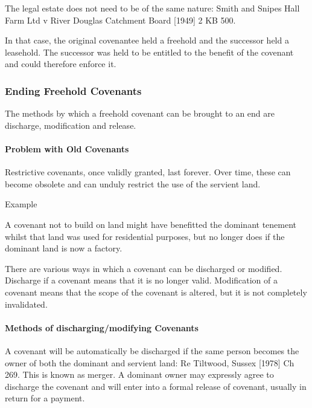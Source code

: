 \documentclass[
]{article}
\newenvironment{env-de3101d4-f08b-48eb-bc0e-2fa06f3bcf8e}
{
    \savenotes\tcolorbox[blanker,breakable,left=5pt,borderline west={2pt}{-4pt}{purple}]
}
{
    \endtcolorbox\spewnotes
}
\begin{document}
The legal estate does not need to be of the same nature: Smith and
Snipes Hall Farm Ltd v River Douglas Catchment Board {[}1949{]} 2 KB
500.

In that case, the original covenantee held a freehold and the successor
held a leasehold. The successor was held to be entitled to the benefit
of the covenant and could therefore enforce it.

\hypertarget{ending-freehold-covenants}{%
\subsubsection{Ending Freehold
Covenants}\label{ending-freehold-covenants}}

The methods by which a freehold covenant can be brought to an end are
discharge, modification and release.

\hypertarget{problem-with-old-covenants}{%
\paragraph{Problem with Old
Covenants}\label{problem-with-old-covenants}}

Restrictive covenants, once validly granted, last forever. Over time,
these can become obsolete and can unduly restrict the use of the
servient land.

\begin{env-de3101d4-f08b-48eb-bc0e-2fa06f3bcf8e}

Example

A covenant not to build on land might have benefitted the dominant
tenement whilst that land was used for residential purposes, but no
longer does if the dominant land is now a factory.

\end{env-de3101d4-f08b-48eb-bc0e-2fa06f3bcf8e}

There are various ways in which a covenant can be discharged or
modified. Discharge if a covenant means that it is no longer valid.
Modification of a covenant means that the scope of the covenant is
altered, but it is not completely invalidated.

\hypertarget{methods-of-dischargingmodifying-covenants}{%
\paragraph{Methods of discharging/modifying
Covenants}\label{methods-of-dischargingmodifying-covenants}}

A covenant will be automatically be discharged if the same person
becomes the owner of both the dominant and servient land: Re Tiltwood,
Sussex {[}1978{]} Ch 269. This is known as merger. A dominant owner may
expressly agree to discharge the covenant and will enter into a formal
release of covenant, usually in return for a payment.
\end{document}

